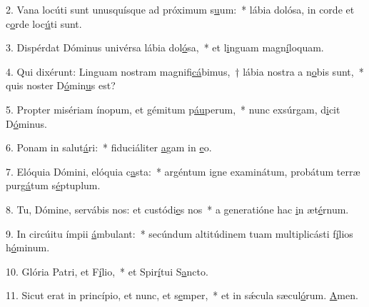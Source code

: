 2. Vana locúti sunt unusquísque ad próximum s\uline{u}um:~* lábia dolósa, in corde et c\uline{o}rde loc\uline{ú}ti sunt.\par 
3. Dispérdat Dóminus univérsa lábia dol\uline{ó}sa,~* et l\uline{i}nguam magn\uline{í}loquam.\par 
4. Qui dixérunt: Linguam nostram magnifi\uline{cá}bimus,~† lábia nostra a n\uline{o}bis sunt,~* quis noster D\uline{ó}min\uline{u}s est?\par 
5. Propter misériam ínopum, et gémitum p\uline{áu}perum,~* nunc exsúrgam, d\uline{i}cit D\uline{ó}minus.\par 
6. Ponam in salut\uline{á}ri:~* fiduciáliter \uline{a}gam in \uline{e}o.\par 
7. Elóquia Dómini, elóquia c\uline{a}sta:~* argéntum igne examinátum, probátum terræ purg\uline{á}tum s\uline{é}ptuplum.\par 
8. Tu, Dómine, servábis nos: et custódi\uline{e}s nos~* a generatióne hac \uline{i}n æt\uline{é}rnum.\par 
9. In circúitu ímpii \uline{á}mbulant:~* secúndum altitúdinem tuam multiplicásti f\uline{í}lios h\uline{ó}minum.\par 
10. Glória Patri, et F\uline{í}lio,~* et Spir\uline{í}tui S\uline{a}ncto.\par 
11. Sicut erat in princípio, et nunc, et s\uline{e}mper,~* et in sǽcula sæcul\uline{ó}rum. \uline{A}men.\par 

